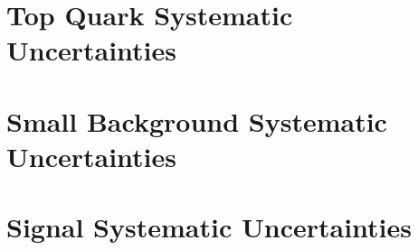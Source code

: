 
\section{Top Quark Systematic Uncertainties}


\section{Small Background Systematic Uncertainties}


\section{Signal Systematic Uncertainties}





